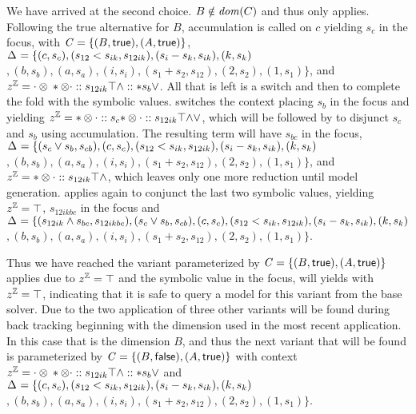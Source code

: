 We have arrived at the second choice. $B \notin \dom{C}$ and thus only \crChc
applies. Following the true alternative for $B$, accumulation is called on $c$
yielding $s_{c}$ in the focus, with $\configuration = \set{(B,\true),
  (A,\true)}$, $\aStore{}=\{(c,s_{c}),(s_{12} < s_{ik}, s_{12ik}),(s_{i} -
s_{k}, s_{ik}),(k,s_{k})$ $ ,(b, s_{b}), (a,s_{a}),(i, s_{i}),(s_{1} + s_{2},
s_{12}), (2,s_{2}), (1,s_{1})\}$, and $\zipper =
\inBoolL*{\inBoolR*{s_{12ik}}{\inRoot{}}{\wedge}}{s_{b}}{\vee}$. All that is
left is a switch and then to complete the fold with the symbolic values.
\crBoolL{} switches the context placing $s_{b}$ in the focus and yielding
$\zipper = \inBoolR*{s_{c}}{\inBoolR*{s_{12ik}}{\inRoot{}}{\wedge}}{\vee}$,
which will be followed by \crBoolR{} to disjunct $s_{c}$ and $s_{b}$ using
accumulation. The resulting term will have $s_{bc}$ in the focus,
$\aStore{}=\{(s_{c} \vee s_{b}, s_{cb}),(c,s_{c}),(s_{12} < s_{ik},
s_{12ik}),(s_{i} - s_{k}, s_{ik}),(k,s_{k})$ $ ,(b, s_{b}), (a,s_{a}),(i,
s_{i}),(s_{1} + s_{2}, s_{12}), (2,s_{2}), (1,s_{1})\}$, and $\zipper =
\inBoolR*{s_{12ik}}{\inRoot{}}{\wedge}$, which leaves only one more reduction
until model generation. \crBoolR{} applies again to conjunct the last two
symbolic values, yielding $\zipper = \inRoot{}$, $s_{12ikbc}$ in the focus and
$\aStore{}=\{(s_{12ik} \wedge s_{bc}, s_{12ikbc}), (s_{c} \vee s_{b},
s_{cb}),(c,s_{c}),(s_{12} < s_{ik}, s_{12ik}),(s_{i} - s_{k}, s_{ik}),(k,s_{k})$
$ ,(b, s_{b}), (a,s_{a}),(i, s_{i}),(s_{1} + s_{2}, s_{12}), (2,s_{2}),
(1,s_{1})\}$.

Thus we have reached the variant parameterized by
$\configuration=\set{(B,\true),(A,\true)}$ \crEval{} applies due to $\zipper =
\inRoot{}$ and the symbolic value in the focus, \evSym{} will yields \unit{}
with $\zipper = \inRoot{}$, indicating that it is safe to query a model for this
variant from the base solver. Due to the two application of \crChc three other
variants will be found during back tracking beginning with the dimension used in
the most recent application. In this case that is the dimension $B$, and thus
the next variant that will be found is parameterized by
$\configuration=\set{(B,\false),(A, \true)}$ with context $\zipper =
\inBoolL*{\inBoolR*{s_{12ik}}{\inRoot{}}{\wedge}}{s_{b}}{\vee}$ and
$\aStore{}=\{(c,s_{c}),(s_{12} < s_{ik}, s_{12ik}),(s_{i} - s_{k},
s_{ik}),(k,s_{k})$ $,(b, s_{b}), (a,s_{a}),(i, s_{i}),(s_{1} + s_{2}, s_{12}),
(2,s_{2}), (1,s_{1})\}$.

